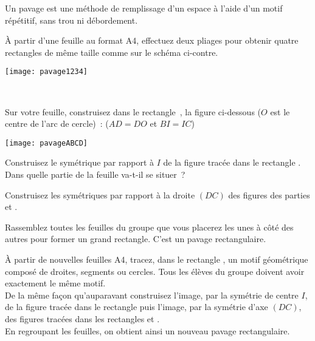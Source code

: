 \begin{TP}

Un pavage est une méthode de remplissage d'un espace à l'aide d'un motif répétitif, sans trou ni débordement.

\begin{enumerate}
\begin{minipage}[c]{0.58\linewidth}
 \item À partir d'une feuille au format A4, effectuez deux pliages pour obtenir quatre rectangles de même taille comme sur le schéma ci-contre.
 \end{minipage} \hfill%
 \begin{minipage}[c]{0.38\linewidth}
 \texttt{[image: pavage1234]}
  \end{minipage} \\
 \item Sur votre feuille, construisez dans le rectangle , la figure ci-dessous ($O$ est le centre de l'arc de cercle) : ($AD = DO$ et $BI = IC$)
 \begin{center} \texttt{[image: pavageABCD]} \end{center}
 \item Construisez le symétrique par rapport à $I$ de la figure tracée dans le rectangle . Dans quelle partie de la feuille va-t-il se situer ?
 \item Construisez les symétriques par rapport à la droite $(DC)$ des figures des parties  et .
 \end{enumerate}
Rassemblez toutes les feuilles du groupe que vous placerez les unes à côté des autres pour former un grand rectangle. C'est un pavage rectangulaire.

À partir de nouvelles feuilles A4, tracez, dans le rectangle  , un motif géométrique composé de droites, segments ou cercles. Tous les élèves du groupe doivent avoir exactement le même motif. \\[0.5em]
De la même façon qu'auparavant construisez l'image, par la symétrie de centre $I$, de la figure tracée dans le rectangle  puis l'image, par la symétrie d'axe $(DC)$, des figures tracées dans les rectangles  et . \\[0.5em]
En regroupant les feuilles, on obtient ainsi un nouveau pavage rectangulaire.
\end{TP}

\vfill


